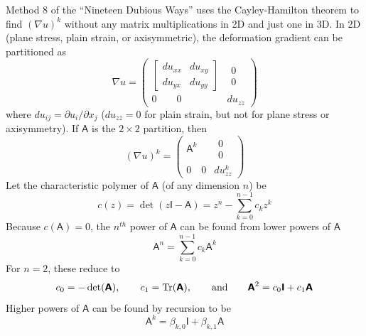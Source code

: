 \documentclass[11pt]{article}
\newcommand{\tens}[1]{\boldsymbol{\mathsf{#1}}}
\begin{document}
Method 8 of the ``Nineteen Dubious Ways'' uses the Cayley-Hamilton theorem to find $(\nabla u)^k$ without any matrix multiplications in 2D and just one in 3D. In 2D (plane stress, plain strain, or axisymmetric), the deformation gradient can be partitioned as
\begin{equation}
       \nabla u = \left(\begin{array}{cc}
               \left[\begin{array}{cc}
                      du_{xx} & du_{xy} \\
                      du_{yx} & du_{yy}
                     \end{array}\right] & \begin{array}{c} 0 \\ 0 \end{array} \\
                     0 \qquad 0  & du_{zz}
                 \end{array}\right)
\end{equation}
where $du_{ij} = \partial u_i/\partial x_j$ ($du_{zz}=0$ for plain strain, but not for plane stress or axisymmetry). If $\tens A$ is the $2\times2$ partition, then
\begin{equation}
    (\nabla u)^k = \left(\begin{array}{cc}
                \tens A^k & \begin{array}{c} 0 \\ 0 \end{array} \\
                 0 \quad 0  & du_{zz}^k
              \end{array}\right)
\end{equation}
Let the characteristic polymer of $\tens A$ (of any dimension $n$) be
\begin{equation}
    c(z) = \det(z\tens I - \tens A) = z^n - \sum_{k=0}^{n-1} c_k z^k
\end{equation}
Because $c(\tens A)=0$, the $n^{th}$ power of $\tens A$ can be found from lower powers of $\tens A$
\begin{equation}
     \tens A^n = \sum_{k=0}^{n-1} c_k \tens A^k
\end{equation}
For $n=2$, these reduce to
\begin{equation}
    c_0 = -\det(\tens A), \qquad c_1 = {\rm Tr}(\tens A), \qquad {\rm and} \qquad \tens A^2 = c_0\tens I + c_1\tens A
\end{equation}
Higher powers of $\tens A$ can be found by recursion to be
\begin{equation}
     \tens A^k = \beta_{k,0}\tens I + \beta_{k,1}\tens A
\end{equation}
\end{document}
